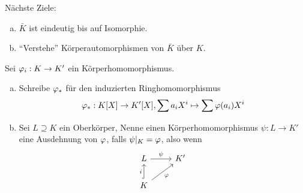\documentclass[a4paper]{report}
\begin{document}
\begin{bem*}
  Nächste Ziele:
  \begin{enumerate}[(a)]
    \item $\bar K$ ist eindeutig bis auf Isomorphie.
    \item ``Verstehe'' Körperautomorphismen von $\bar K$ über $K$.
  \end{enumerate}
\end{bem*}

\begin{bezen}
  Sei $\varphi_{i} : K \to K'$ ein Körperhomomorphismus.
  \begin{enumerate}[(a)]
    \item Schreibe $\varphi_{*}$ für den induzierten Ringhomomorphismus \[\varphi_{*} : K[X] \to K'[X], \sum a_{i}X^{i} \mapsto \sum \varphi(a_{i})X^{i}\]
    \item Sei $L \supseteq K$ ein Oberkörper, Nenne einen Körperhomomorphismus $\psi : L \to K'$ eine Ausdehnung von $\varphi$, falls $\psi|_{K} = \varphi$, also wenn
\[\begin{tikzcd}
L \arrow[r, "\psi"]                           & K' \\
K \arrow[ru, "\varphi"'] \arrow[u, "i", hook] &
\end{tikzcd}\]
  \end{enumerate}
\end{bezen}
\end{document}
